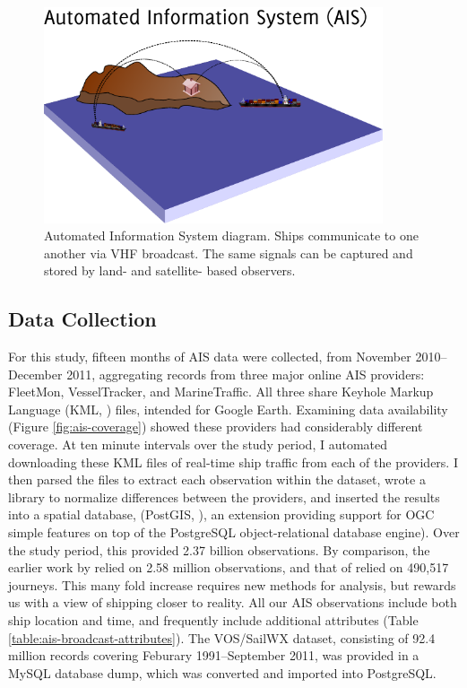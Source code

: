 \documentclass[12pt,letterpaper]{article}
\begin{document}
\begin{figure}[htbp]
  \centering
  \includegraphics[width=100mm]{images/towers/drawing.pdf}
  \caption{Automated Information System diagram. Ships communicate to one another via VHF broadcast. The same signals can be captured and stored by land- and satellite- based observers.}
  \label{fig:ais-overview}
\end{figure}

\subsection{Data Collection}

For this study, fifteen months of AIS data were collected, from November 2010--December 2011, aggregating records from three major online AIS providers: FleetMon, VesselTracker, and MarineTraffic. All three share Keyhole Markup Language (KML, \citeauthor{KML}) files, intended for Google Earth. Examining data availability (Figure \ref{fig:ais-coverage}) showed these providers had considerably different coverage. At ten minute intervals over the study period, I automated downloading these KML files of real-time ship traffic from each of the providers. I then parsed the files to extract each observation within the dataset, wrote a library to normalize differences between the providers, and inserted the results into a spatial database, (PostGIS, \citeauthor{ramsey2005postgis}), an extension providing support for OGC simple features \citep{OGCSimple} on top of the PostgreSQL \citep{postgresql} object-relational database engine). Over the study period, this provided 2.37 billion observations. By comparison, the earlier work by \cite{Halpern2008} relied on 2.58 million observations, and that of \cite{Kaluza2010} relied on 490,517 journeys. This many fold increase requires new methods for analysis, but rewards us with a view of shipping closer to reality. %
All our AIS observations include both ship location and time, and frequently include additional attributes (Table \ref{table:ais-broadcast-attributes}).  The VOS/SailWX dataset, consisting of 92.4 million records covering Feburary 1991--September 2011, was provided in a MySQL database dump, which was converted and imported into PostgreSQL. 
\end{document}
